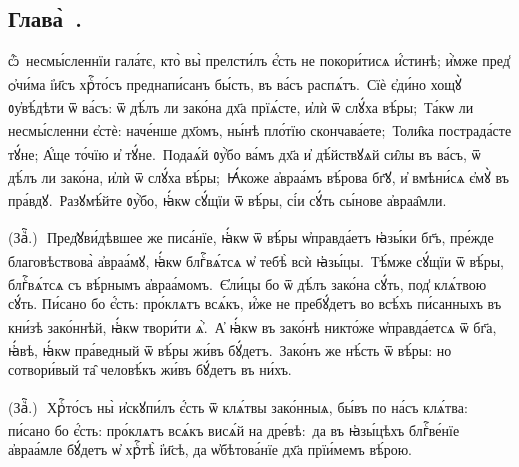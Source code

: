 \subsection{Глава̀~.}

\cuLettrine ѽ~несмы́сленнїи гала́тє, кто̀ вы̀ прелсти́лъ є҆́сть не покори́тисѧ и҆́стинѣ; и҆̀мже пред̾ ѻ҆чи́ма і҆и҃съ хрⷭ҇то́съ преднапи́санъ бы́сть, въ ва́съ распѧ́тъ. \textsuperscript{}\,Сїѐ є҆ди́но хощꙋ̀ ᲂу҆вѣ́дѣти ѿ ва́съ: ѿ дѣ́лъ ли зако́на дх҃а прїѧ́сте, и҆лѝ ѿ слꙋ́ха вѣ́ры; \textsuperscript{}\,Та́кѡ ли несмы́сленни є҆стѐ: наче́нше дх҃омъ, ны́нѣ пло́тїю скончава́ете; \textsuperscript{}\,Толи̑ка пострада́сте тꙋ́не; А҆́ще то́чїю и҆ тꙋ́не. \textsuperscript{}\,Подаѧ́й ᲂу҆̀бо ва́мъ дх҃а и҆ дѣ́йствꙋѧй си̑лы въ ва́съ, ѿ дѣ́лъ ли зако́на, и҆лѝ ѿ слꙋ́ха вѣ́ры; \textsuperscript{}\,Ꙗ҆́коже а҆враа́мъ вѣ́рова бг҃ꙋ, и҆ вмѣни́сѧ є҆мꙋ̀ въ пра́вдꙋ. \textsuperscript{}\,Разꙋмѣ́йте ᲂу҆̀бо, ꙗ҆́кѡ сꙋ́щїи ѿ вѣ́ры, сі́и сꙋ́ть сы́нове а҆враа̑мли.

(Заⷱ҇\:.)~\textsuperscript{}\,Пред̾ꙋви́дѣвшее же писа́нїе, ꙗ҆́кѡ ѿ вѣ́ры ѡ҆правда́етъ ꙗ҆зы́ки бг҃ъ, пре́жде благовѣствова̀ а҆враа́мꙋ, ꙗ҆́кѡ блгⷭ҇вѧ́тсѧ ѡ҆ тебѣ̀ всѝ ꙗ҆зы́цы. \textsuperscript{}\,Тѣ́мже сꙋ́щїи ѿ вѣ́ры, блгⷭ҇вѧ́тсѧ съ вѣ́рнымъ а҆враа́момъ. \textsuperscript{}\,Є҆ли́цы бо ѿ дѣ́лъ зако́на сꙋ́ть, под̾ клѧ́твою сꙋ́ть. Пи́сано бо є҆́сть: про́клѧтъ всѧ́къ, и҆́же не пребꙋ́детъ во всѣ́хъ пи́санныхъ въ кни́зѣ зако́ннѣй, ꙗ҆́кѡ твори́ти ѧ҆̀. \textsuperscript{}\,А҆ ꙗ҆́кѡ въ зако́нѣ никто́же ѡ҆правда́етсѧ ѿ бг҃а, ꙗ҆́вѣ, ꙗ҆́кѡ пра́ведный ѿ вѣ́ры жи́въ бꙋ́детъ. \textsuperscript{}\,Зако́нъ же нѣ́сть ѿ вѣ́ры: но сотвори́вый та̑ человѣ́къ жи́въ бꙋ́детъ въ ни́хъ.

(Заⷱ҇\:.)~\textsuperscript{}\,Хрⷭ҇то́съ ны̀ и҆скꙋпи́лъ є҆́сть ѿ клѧ́твы зако́нныѧ, бы́въ по на́съ клѧ́тва: пи́сано бо є҆́сть: про́клѧтъ всѧ́къ висѧ́й на дре́вѣ: \textsuperscript{}\,да въ ꙗ҆зы́цѣхъ блгⷭ҇ве́нїе а҆враа́мле бꙋ́детъ ѡ҆ хрⷭ҇тѣ̀ і҆и҃сѣ, да ѡ҆бѣтова́нїе дх҃а прїи́мемъ вѣ́рою.

